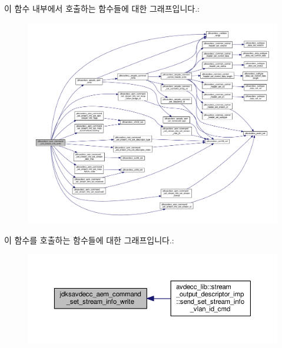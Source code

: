 이 함수 내부에서 호출하는 함수들에 대한 그래프입니다.\+:
\nopagebreak
\begin{figure}[H]
\begin{center}
\leavevmode
\includegraphics[width=350pt]{group__command__set__stream__info_gacd184f2efdcdb28691a2d1873067f6b8_cgraph}
\end{center}
\end{figure}




이 함수를 호출하는 함수들에 대한 그래프입니다.\+:
\nopagebreak
\begin{figure}[H]
\begin{center}
\leavevmode
\includegraphics[width=350pt]{group__command__set__stream__info_gacd184f2efdcdb28691a2d1873067f6b8_icgraph}
\end{center}
\end{figure}


